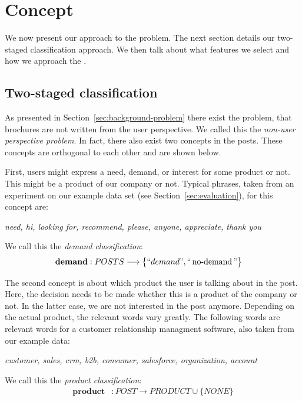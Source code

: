 \section{Concept}
\label{sec:concept}
We now present our approach to the \nto problem.
The next section details our two-staged classification approach.
We then talk about what features we select and how we approach the .

\subsection{Two-staged classification}
As presented in Section~\ref{sec:background-problem} there exist the problem, that brochures are not written from the user perspective.
We called this the \emph{non-user perspective problem}.
In fact, there also exist two concepts in the posts.
These concepts are orthogonal to each other and are shown below.

First, users might express a need, demand, or interest for some product or not.
This might be a product of our company or not.
Typical phrases, taken from an experiment on our example data set (see Section~\ref{sec:evaluation}), for this concept are:
\begin{center}
	\textit{need, hi, looking for, recommend, please, anyone, appreciate, thank you}
\end{center}
We call this the \emph{demand classification}:
\begin{align}
	\mathbf{demand}&: POSTS \longrightarrow \big\{ ``demand", ``\operatorname{no-demand}" \big\}
\end{align}

The second concept is about which product the user is talking about in the post.
Here, the decision needs to be made whether this is a product of the company or not.
In the latter case, we are not interested in the post anymore.
Depending on the actual product, the relevant words vary greatly.
The following words are relevant words for a customer relationship managment software, also taken from our example data:
\begin{center}
	\textit{customer, sales, crm, b2b, consumer, salesforce, organization, account}
\end{center}

We call this the \emph{product classification}:
\begin{align}
	\mathbf{product}&: POST \longrightarrow  PRODUCT \cup \big\{ NONE \big\}
\end{align}

